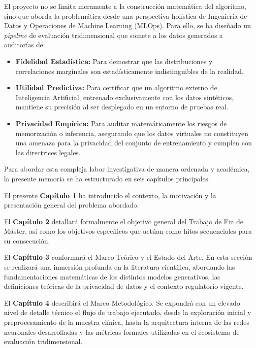 El proyecto no se limita meramente a la construcción matemática del algoritmo, sino que aborda la problemática desde una perspectiva holística de Ingeniería de Datos y Operaciones de Machine Learning (MLOps). Para ello, se ha diseñado un \textit{pipeline} de evaluación tridimensional que somete a los datos generados a auditorías de:
\begin{itemize}
    \item \textbf{Fidelidad Estadística:} Para demostrar que las distribuciones y correlaciones marginales son estadísticamente indistinguibles de la realidad.
    \item \textbf{Utilidad Predictiva:} Para certificar que un algoritmo externo de Inteligencia Artificial, entrenado exclusivamente con los datos sintéticos, mantiene su precisión al ser desplegado en un entorno de pruebas real.
    \item \textbf{Privacidad Empírica:} Para auditar matemáticamente los riesgos de memorización o inferencia, asegurando que los datos virtuales no constituyen una amenaza para la privacidad del conjunto de entrenamiento y cumplen con las directrices legales.
\end{itemize}

Para abordar esta compleja labor investigativa de manera ordenada y académica, la presente memoria se ha estructurado en seis capítulos principales. 

El presente \textbf{Capítulo 1} ha introducido el contexto, la motivación y la presentación general del problema abordado. 

El \textbf{Capítulo 2} detallará formalmente el objetivo general del Trabajo de Fin de Máster, así como los objetivos específicos que actúan como hitos secuenciales para su consecución. 

El \textbf{Capítulo 3} conformará el Marco Teórico y el Estado del Arte. En esta sección se realizará una inmersión profunda en la literatura científica, abordando las fundamentaciones matemáticas de los distintos modelos generativos, las definiciones teóricas de la privacidad de datos y el contexto regulatorio vigente.

El \textbf{Capítulo 4} describirá el Marco Metodológico. Se expondrá con un elevado nivel de detalle técnico el flujo de trabajo ejecutado, desde la exploración inicial y preprocesamiento de la muestra clínica, hasta la arquitectura interna de las redes neuronales desarrolladas y las métricas formales utilizadas en el ecosistema de evaluación tridimensional.


